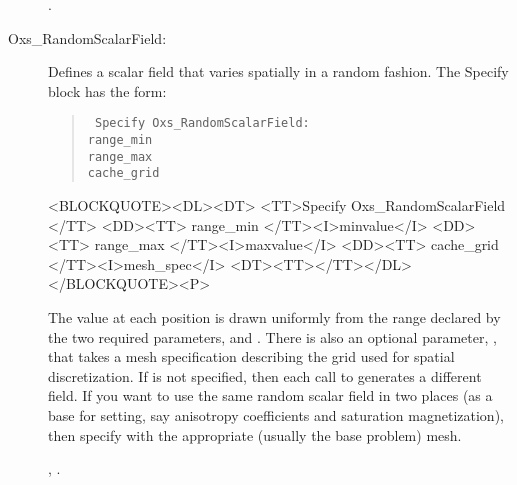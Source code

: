 \begin{description}
\begin{ExampleMifs}[Example]
  .
\end{ExampleMifs}

\item[Oxs\_RandomScalarField:]\label{item:RandomScalarField}
%
Defines a scalar field that varies spatially in a random fashion.
The Specify block has the form:
      \begin{latexonly}
      \begin{quote}\tt
      Specify Oxs\_RandomScalarField: \ocb\\
       \bi range\_min \\
       \bi range\_max \\
       \bi cache\_grid \\
      \ccb
      \end{quote}
      \end{latexonly}
      \begin{rawhtml}
      <BLOCKQUOTE><DL><DT>
      <TT>Specify Oxs_RandomScalarField {</TT>
      <DD><TT> range_min </TT><I>minvalue</I>
      <DD><TT> range_max </TT><I>maxvalue</I>
      <DD><TT> cache_grid </TT><I>mesh_spec</I>
      <DT><TT>}</TT></DL></BLOCKQUOTE><P>
      \end{rawhtml}
The value at each position is drawn uniformly from the range declared by
the two required parameters,  and
.  There is also an optional parameter,
, that takes a mesh specification describing
the grid used for spatial discretization.  If
 is not specified, then each call to
 generates a different field.  If you want to
use the same random scalar field in two places (as a base for setting,
say anisotropy coefficients and saturation magnetization), then specify
 with the appropriate (usually the base problem)
mesh.

\begin{ExampleMifs}
  , .
\end{ExampleMifs}


\end{description}
